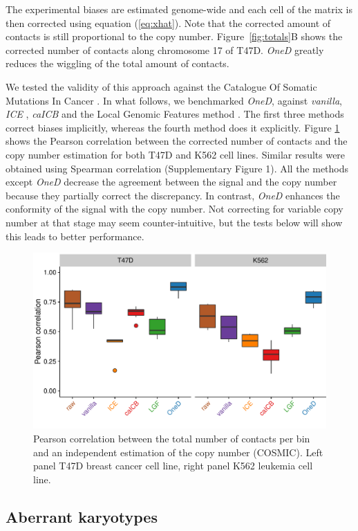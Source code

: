 \documentclass{bioinfo}
\begin{document}
The experimental biases are estimated genome-wide and each cell of the
matrix is then corrected using equation (\ref{eq:xhat}). Note that the
corrected amount of contacts is still proportional to the copy number.
Figure~\ref{fig:totals}B shows the corrected number of contacts along
chromosome 17 of T47D. \textit{OneD} greatly reduces the wiggling of the
total amount of contacts.

We tested the validity of this approach against the Catalogue Of Somatic
Mutations In Cancer \citep[COSMIC,][]{forbes2010cosmic}. In what follows,
we benchmarked \textit{OneD}, against \textit{vanilla}, \textit{ICE}
\citep{imakaev2012iterative}, \textit{caICB} \citep{wu2016computational}
and the Local Genomic Features method
\citep[\textit{LGF},][]{hu2012hicnorm, servant2012hitc}. The first three
methods correct biases implicitly, whereas the fourth method does it
explicitly. Figure \ref{fig:copy_number} shows the Pearson correlation
between the corrected number of contacts and the copy number estimation
for both T47D and K562 cell lines. Similar results were obtained using
Spearman correlation (Supplementary Figure 1). All the methods except
\textit{OneD} decrease the agreement between the signal and the copy
number because they partially correct the discrepancy. In contrast,
\textit{OneD} enhances the conformity of the signal with the copy number.
Not correcting for variable copy number at that stage may seem
counter-intuitive, but the tests below will show this leads to better
performance.


\begin{figure}[b]
	\centerline{\includegraphics[width=.45\textwidth]
{img/copy_number_figure2.pdf}}
\caption{Pearson correlation between the total number of contacts per bin
and an independent estimation of the copy number (COSMIC). Left panel
T47D breast cancer cell line, right panel K562 leukemia cell line.}
\label{fig:copy_number}
\end{figure}




\subsection{Aberrant karyotypes}
\end{document}
